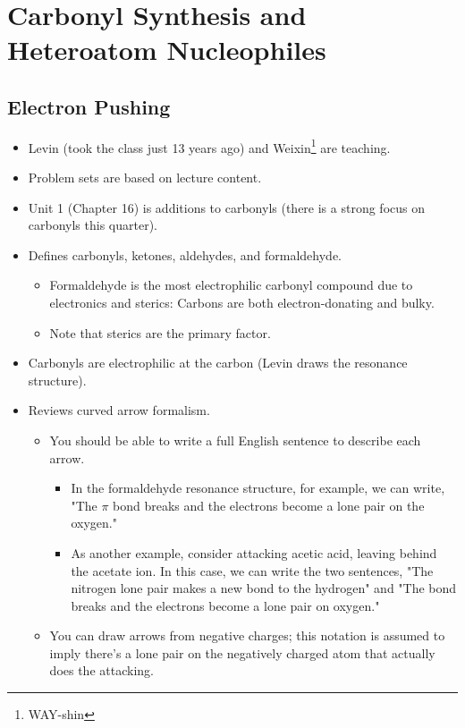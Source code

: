 \documentclass[../notes.tex]{subfiles}
\begin{document}
\chapter{Carbonyl Synthesis and Heteroatom Nucleophiles}
\section{Electron Pushing}
\begin{itemize}
    \item {}Levin (took the class just 13 years ago) and Weixin\footnote{WAY-shin} are teaching.
    \item Problem sets are based on lecture content.
    \item Unit 1 (Chapter 16) is additions to carbonyls (there is a strong focus on carbonyls this quarter).
    \item Defines carbonyls, ketones, aldehydes, and formaldehyde.
    \begin{itemize}
        \item Formaldehyde is the most electrophilic carbonyl compound due to electronics and sterics: Carbons are both electron-donating and bulky.
        \item Note that sterics are the primary factor.
    \end{itemize}
    \item Carbonyls are electrophilic at the carbon (Levin draws the resonance structure).
    \item Reviews curved arrow formalism.
    \begin{itemize}
        \item You should be able to write a full English sentence to describe each arrow.
        \begin{itemize}
            \item In the formaldehyde resonance structure, for example, we can write, "The  $\pi$ bond breaks and the electrons become a lone pair on the oxygen."
            \item As another example, consider  attacking acetic acid, leaving behind the acetate ion. In this case, we can write the two sentences, "The nitrogen lone pair makes a new bond to the hydrogen" and "The  bond breaks and the electrons become a lone pair on oxygen."
        \end{itemize}
        \item You can draw arrows from negative charges; this notation is assumed to imply there's a lone pair on the negatively charged atom that actually does the attacking.

\end{itemize}
\end{itemize}
\end{document}
